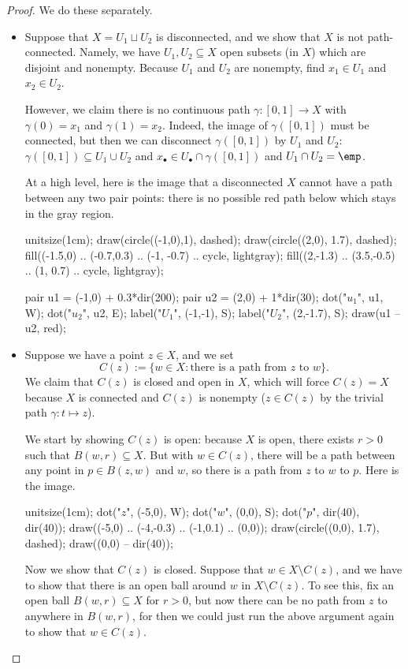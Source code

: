 \begin{proof}
	We do these separately.
	\begin{itemize}
		\item Suppose that $X=U_1\sqcup U_2$ is disconnected, and we show that $X$ is not path-connected. Namely, we have $U_1,U_2\subseteq X$ open subsets (in $X$) which are disjoint and nonempty. Because $U_1$ and $U_2$ are nonempty, find $x_1\in U_1$ and $x_2\in U_2$.

		However, we claim there is no continuous path $\gamma:[0,1]\to X$ with $\gamma(0)=x_1$ and $\gamma(1)=x_2$. Indeed, the image of $\gamma([0,1])$ must be connected, but then we can disconnect $\gamma([0,1])$ by $U_1$ and $U_2$: $\gamma([0,1])\subseteq U_1\cup U_2$ and $x_\bullet\in U_\bullet\cap\gamma([0,1])$ and $U_1\cap U_2=\emp$.

		At a high level, here is the image that a disconnected $X$ cannot have a path between any two pair points: there is no possible red path below which stays in the gray region.
		\begin{center}
			\begin{asy}
				unitsize(1cm);
				draw(circle((-1,0),1), dashed);
				draw(circle((2,0), 1.7), dashed);
				fill((-1.5,0) .. (-0.7,0.3) .. (-1, -0.7) .. cycle, lightgray);
				fill((2,-1.3) .. (3.5,-0.5) .. (1, 0.7) .. cycle, lightgray);

				pair u1 = (-1,0) + 0.3*dir(200);
				pair u2 = (2,0) + 1*dir(30);
				dot("$u_1$", u1, W);
				dot("$u_2$", u2, E);
				label("$U_1$", (-1,-1), S);
				label("$U_2$", (2,-1.7), S);
				draw(u1 -- u2, red);
			\end{asy}
		\end{center}

		\item Suppose we have a point $z\in X$, and we set
		\[C(z):=\{w\in X:\text{there is a path from }z\text{ to }w\}.\]
		We claim that $C(z)$ is closed and open in $X$, which will force $C(z)=X$ because $X$ is connected and $C(z)$ is nonempty ($z\in C(z)$ by the trivial path $\gamma:t\mapsto z$).

		We start by showing $C(z)$ is open: because $X$ is open, there exists $r>0$ such that $B(w,r)\subseteq X$. But with $w\in C(z)$, there will be a path between any point in $p\in B(z,w)$ and $w$, so there is a path from $z$ to $w$ to $p$. Here is the image.
		\begin{center}
			\begin{asy}
				unitsize(1cm);
				dot("$z$", (-5,0), W);
				dot("$w$", (0,0), S);
				dot("$p$", dir(40), dir(40));
				draw((-5,0) .. (-4,-0.3) .. (-1,0.1) .. (0,0));
				draw(circle((0,0), 1.7), dashed);
				draw((0,0) -- dir(40));
			\end{asy}
		\end{center}

		Now we show that $C(z)$ is closed. Suppose that $w\in X\setminus C(z)$, and we have to show that there is an open ball around $w$ in $X\setminus C(z)$. To see this, fix an open ball $B(w,r)\subseteq X$ for $r>0$, but now there can be no path from $z$ to anywhere in $B(w,r)$, for then we could just run the above argument again to show that $w\in C(z)$.
		\qedhere
	\end{itemize}
\end{proof}
